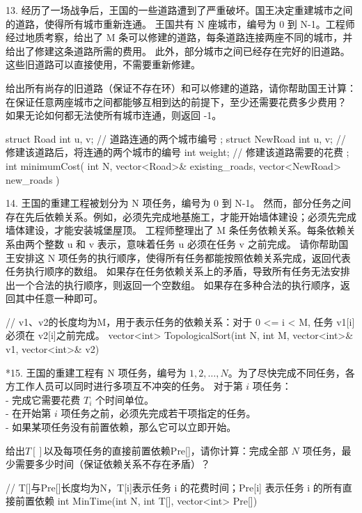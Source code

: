 13. 经历了一场战争后，王国的一些道路遭到了严重破坏。国王决定重建城市之间的道路，使得所有城市重新连通。
王国共有 N 座城市，编号为 0 到 N-1。工程师经过地质考察，给出了 M 条可以修建的道路，每条道路连接两座不同的城市，并给出了修建这条道路所需的费用。
此外，部分城市之间已经存在完好的旧道路。这些旧道路可以直接使用，不需要重新修建。

给出所有尚存的旧道路（保证不存在环）和可以修建的道路，请你帮助国王计算：在保证任意两座城市之间都能够互相到达的前提下，至少还需要花费多少费用？
如果无论如何都无法使所有城市连通，则返回 -1。

\begin{cppcode}
    struct Road {
        int u, v;   // 道路连通的两个城市编号
    };
    struct NewRoad {
        int u, v;   // 修建该道路后，将连通的两个城市的编号
        int weight; // 修建该道路需要的花费
    };
    int minimumCost(
        int N,
        vector<Road>& existing_roads,
        vector<NewRoad> new_roads
    ) {

    }
\end{cppcode}

\vspace{\baselineskip}

14.
王国的重建工程被划分为 N 项任务，编号为 0 到 N-1。
然而，部分任务之间存在先后依赖关系。例如，必须先完成地基施工，才能开始墙体建设；必须先完成墙体建设，才能安装城堡屋顶。
工程师整理出了 M 条任务依赖关系。每条依赖关系由两个整数 u 和 v 表示，意味着任务 u 必须在任务 v 之前完成。
请你帮助国王安排这 N 项任务的执行顺序，使得所有任务都能按照依赖关系完成，返回代表任务执行顺序的数组。
如果存在任务依赖关系上的矛盾，导致所有任务无法安排出一个合法的执行顺序，则返回一个空数组。
如果存在多种合法的执行顺序，返回其中任意一种即可。

\begin{cppcode}
    // v1、v2的长度均为M，用于表示任务的依赖关系：对于 0 <= i < M, 任务 v1[i] 必须在 v2[i]之前完成。
    vector<int> TopologicalSort(int N, int M, vector<int>& v1, vector<int>& v2) {

    }
\end{cppcode}

\vspace{\baselineskip}

*15. 王国的重建工程有 N 项任务，编号为 $1,2,\ldots,N$。为了尽快完成不同任务，各方工作人员可以同时进行多项互不冲突的任务。
对于第 $i$ 项任务：\\
- 完成它需要花费 $T_i$ 个时间单位。\\
- 在开始第 $i$ 项任务之前，必须先完成若干项指定的任务。\\
- 如果某项任务没有前置依赖，那么它可以立即开始。

给出$T[]$以及每项任务的直接前置依赖Pre[]，请你计算：完成全部 $N$ 项任务，最少需要多少时间（保证依赖关系不存在矛盾）？


\begin{cppcode}
    // T[]与Pre[]长度均为N，T[i]表示任务 i 的花费时间；Pre[i] 表示任务 i 的所有直接前置依赖
    int MinTime(int N, int T[], vector<int> Pre[]) {

    }
\end{cppcode}


